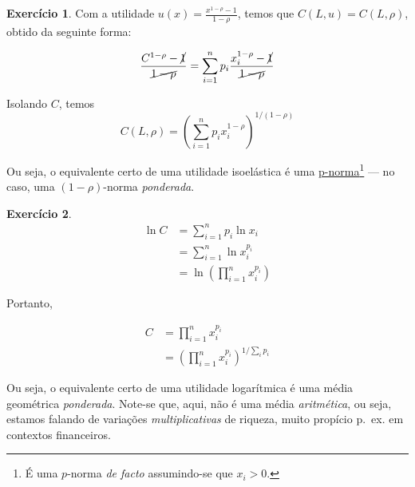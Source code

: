 \documentclass[12pt]{article}
\numberwithin{equation}{section}
\theoremstyle{plain}
\theoremstyle{definition}
\newtheorem{exercise}{Exercício}
\theoremstyle{remark}
\begin{document}
\begin{exercise}
Com a utilidade \(u(x) = \frac{x^{1-\rho}-1}{1-\rho}\), temos que
\(C(L, u) = C(L, \rho)\), obtido da seguinte forma:

\begin{align*}
\frac{C^{1-\rho}-\cancel{ 1 }}{\cancel{ 1-\rho }} &= \sum \limits_{i=1}^{n} p_{i} \frac{x_{i}^{1-\rho}-\cancel{ 1 }}{\cancel{ 1-\rho }} \\
\end{align*}

Isolando \(C\), temos
\[
C(L, \rho) = \left( \sum \limits_{i=1}^{n} p_{i} x_{i}^{1-\rho} \right)^{1/(1-\rho)}
\]

Ou seja, o equivalente certo de uma utilidade isoelástica é uma
\href{https://en.wikipedia.org/wiki/Norm_(mathematics)\#p-norm}{p-norma}\footnote{É
  uma \(p\)-norma \textit{de facto} assumindo-se que \(x_{i}>0\).} ---
no caso, uma \((1-\rho)\)-norma \textit{ponderada}.
\end{exercise}

\begin{exercise}
\begin{align*}
\ln C &= \sum \limits_{i=1}^{n} p_{i} \ln x_{i} \\
&= \sum \limits_{i=1}^{n} \ln x_{i}^{p_{i}} \\
&= \ln \left( \prod \limits_{i=1}^{n} x_{i}^{p_{i}} \right)
\end{align*}

Portanto,

\begin{align*}
C &= \prod \limits_{i=1}^{n} x_{i}^{p_{i}} \\
&= \left( \prod \limits_{i=1}^{n} x_{i}^{p_{i}} \right)^{1/\sum \limits_{i}p_{i}}
\end{align*}

Ou seja, o equivalente certo de uma utilidade logarítmica é uma média
geométrica \textit{ponderada}. Note-se que, aqui, não é uma média
\textit{aritmética}, ou seja, estamos falando de variações
\textit{multiplicativas} de riqueza, muito propício p.~ex. em contextos
financeiros.
\end{exercise}
\end{document}
